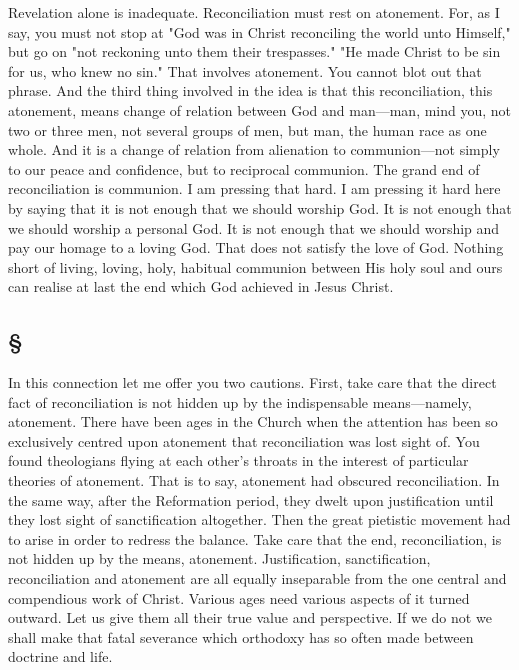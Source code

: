 \documentclass[draft]{ptfdoc}
\begin{document}
Revelation alone is inadequate. Reconciliation 
must rest on atonement. For, as I say, 
you must not stop at "God was in Christ 
reconciling the world unto Himself," but go on 
"not reckoning unto them their trespasses." 
"He made Christ to be sin for us, who knew 
no sin." That involves atonement. You cannot 
blot out that phrase. And the third thing 
involved in the idea is that this reconciliation, 
this atonement, means change of relation between 
God and man---man, mind you, not two 
or three men, not several groups of men, 
but man, the human race as one whole. And it 
is a change of relation from alienation to communion---not 
simply to our peace and confidence, 
but to reciprocal communion. The grand end of 
reconciliation is communion. I am pressing 
that hard. I am pressing it hard here by 
saying that it is not enough that we should 
worship God. It is not enough that we should 
worship a personal God. It is not enough that 
we should worship and pay our homage to a 
loving God. That does not satisfy the love of 
God. Nothing short of living, loving, holy, 
habitual communion between His holy soul and 
ours can realise at last the end which God 
achieved in Jesus Christ. 

\subsection*{
\S
}

In this connection let me offer you two 
cautions. First, take care that the direct fact 
of reconciliation is not hidden up by the indispensable 
means---namely, atonement. There 
have been ages in the Church when the 
attention has been so exclusively centred upon 
atonement that reconciliation was lost sight 
of. You found theologians flying at each 
other's throats in the interest of particular 
theories of atonement. That is to say, atonement 
had obscured reconciliation. In the same 
way, after the Reformation period, they dwelt 
upon justification until they lost sight of 
sanctification altogether. Then the great 
pietistic movement had to arise in order to 
redress the balance. Take care that the end, 
reconciliation, is not hidden up by the means, 
atonement. Justification, sanctification, reconciliation 
and atonement are all equally inseparable 
from the one central and compendious 
work of Christ. Various ages need various 
aspects of it turned outward. Let us give 
them all their true value and perspective. If 
we do not we shall make that fatal severance 
which orthodoxy has so often made between 
doctrine and life. 
\end{document}
